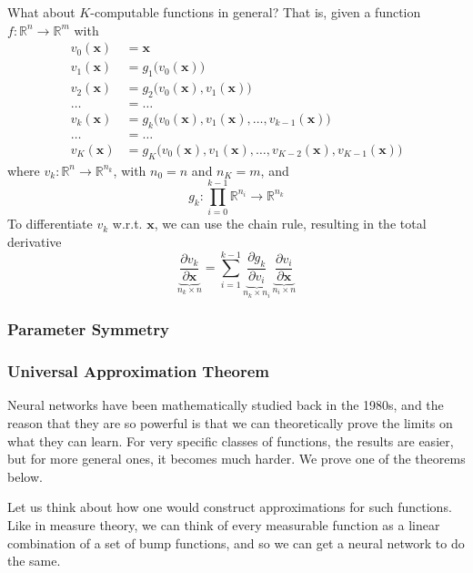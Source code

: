 \documentclass{article}
\begin{document}
       What about $K$-computable functions in general? That is, given a function $f: \mathbb{R}^n \longrightarrow \mathbb{R}^m$ with 
       \begin{align*}
         v_0 (\mathbf{x}) & = \mathbf{x} \\ 
         v_1 (\mathbf{x}) & = g_1 \big(v_0(\mathbf{x}) \big) \\
         v_2 (\mathbf{x}) & = g_2 \big(v_0(\mathbf{x}), v_1 (\mathbf{x}) \big) \\ 
         \ldots & = \ldots \\
         v_k (\mathbf{x}) & = g_k \big(v_0 (\mathbf{x}), v_1(\mathbf{x}), \ldots, v_{k-1} (\mathbf{x}) \big) \\
         \ldots & = \ldots \\
         v_K (\mathbf{x}) & = g_K \big(v_0(\mathbf{x}), v_1 (\mathbf{x}), \ldots, v_{K-2}(\mathbf{x}), v_{K-1}(\mathbf{x}) \big)
       \end{align*}
       where $v_k: \mathbb{R}^n \longrightarrow \mathbb{R}^{n_k}$, with $n_0 = n$ and $n_K = m$, and 
       \[g_k : \prod_{i=0}^{k-1} \mathbb{R}^{n_i} \longrightarrow \mathbb{R}^{n_k}\]
       To differentiate $v_k$ w.r.t. $\mathbf{x}$, we can use the chain rule, resulting in the total derivative 
       \[\underbrace{\frac{\partial v_k}{\partial \mathbf{x}}}_{n_k \times n} = \sum_{i=1}^{k-1} \underbrace{\frac{\partial g_k}{\partial v_i}}_{n_k \times n_i} \, \underbrace{\frac{\partial v_i}{\partial \mathbf{x}}}_{n_i \times n}\]

    \subsubsection{Parameter Symmetry}


    \subsubsection{Universal Approximation Theorem} 

      Neural networks have been mathematically studied back in the 1980s, and the reason that they are so powerful is that we can theoretically prove the limits on what they can learn. For very specific classes of functions, the results are easier, but for more general ones, it becomes much harder. We prove one of the theorems below. 

      Let us think about how one would construct approximations for such functions. Like in measure theory, we can think of every measurable function as a linear combination of a set of bump functions, and so we can get a neural network to do the same.
\end{document}
